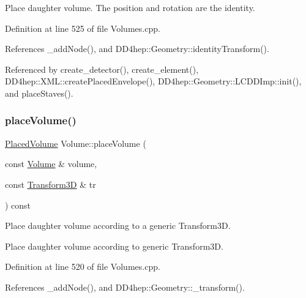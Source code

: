Place daughter volume. The position and rotation are the identity. 



Definition at line 525 of file Volumes.\+cpp.



References \+\_\+add\+Node(), and D\+D4hep\+::\+Geometry\+::identity\+Transform().



Referenced by create\+\_\+detector(), create\+\_\+element(), D\+D4hep\+::\+X\+M\+L\+::create\+Placed\+Envelope(), D\+D4hep\+::\+Geometry\+::\+L\+C\+D\+D\+Imp\+::init(), and place\+Staves().

\hypertarget{class_d_d4hep_1_1_geometry_1_1_volume_a6ab8b32c9172875c1629126f469dd1fe}{}\label{class_d_d4hep_1_1_geometry_1_1_volume_a6ab8b32c9172875c1629126f469dd1fe} 
\subsubsection{\texorpdfstring{place\+Volume()}{placeVolume()}\hspace{0.1cm}{\footnotesize\ttfamily [2/5]}}
{\footnotesize\ttfamily \hyperlink{class_d_d4hep_1_1_geometry_1_1_placed_volume}{Placed\+Volume} Volume\+::place\+Volume (\begin{DoxyParamCaption}\item[{const \hyperlink{class_d_d4hep_1_1_geometry_1_1_volume}{Volume} \&}]{volume,  }\item[{const \hyperlink{namespace_d_d4hep_1_1_geometry_aeb4c0356d12fd7be49a0aae50514e64b}{Transform3D} \&}]{tr }\end{DoxyParamCaption}) const}



Place daughter volume according to a generic Transform3D. 

Place daughter volume according to generic Transform3D. 

Definition at line 520 of file Volumes.\+cpp.



References \+\_\+add\+Node(), and D\+D4hep\+::\+Geometry\+::\+\_\+transform().

\hypertarget{class_d_d4hep_1_1_geometry_1_1_volume_a4d2fa28ba60221a280fb4dfb3eae0f01}{}\label{class_d_d4hep_1_1_geometry_1_1_volume_a4d2fa28ba60221a280fb4dfb3eae0f01} 
